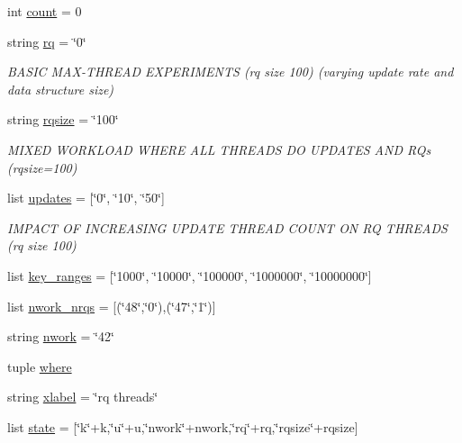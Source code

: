 \begin{DoxyCompactItemize}
int \hyperlink{namespacegraphs_aa0fc62a2a4ce78f5cecca51d9968b0a8}{count} = 0
\item 
string \hyperlink{namespacegraphs_a33bf9d2e68f4dc94babb18dc33f1b61f}{rq} = \char`\"{}0\char`\"{}
\begin{DoxyCompactList}\small\item\em B\+A\+S\+IC M\+A\+X-\/\+T\+H\+R\+E\+AD E\+X\+P\+E\+R\+I\+M\+E\+N\+TS (rq size 100) (varying update rate and data structure size) \end{DoxyCompactList}\item 
string \hyperlink{namespacegraphs_ab34652bfd8c71e2cd2bd43e4e6524525}{rqsize} = \char`\"{}100\char`\"{}
\begin{DoxyCompactList}\small\item\em M\+I\+X\+ED W\+O\+R\+K\+L\+O\+AD W\+H\+E\+RE A\+LL T\+H\+R\+E\+A\+DS DO U\+P\+D\+A\+T\+ES A\+ND R\+Qs (rqsize=100) \end{DoxyCompactList}\item 
list \hyperlink{namespacegraphs_a222bd6a58314240f5bd2dea29ef99ea2}{updates} = \mbox{[}\char`\"{}0\char`\"{}, \char`\"{}10\char`\"{}, \char`\"{}50\char`\"{}\mbox{]}
\begin{DoxyCompactList}\small\item\em I\+M\+P\+A\+CT OF I\+N\+C\+R\+E\+A\+S\+I\+NG U\+P\+D\+A\+TE T\+H\+R\+E\+AD C\+O\+U\+NT ON RQ T\+H\+R\+E\+A\+DS (rq size 100) \end{DoxyCompactList}\item 
list \hyperlink{namespacegraphs_a56c4073988138ac93b88d0073f9af851}{key\+\_\+ranges} = \mbox{[}\char`\"{}1000\char`\"{}, \char`\"{}10000\char`\"{}, \char`\"{}100000\char`\"{}, \char`\"{}1000000\char`\"{}, \char`\"{}10000000\char`\"{}\mbox{]}
\item 
list \hyperlink{namespacegraphs_a65e532f76453ce16272c7242acb8a2d9}{nwork\+\_\+nrqs} = \mbox{[}(\char`\"{}48\char`\"{},\char`\"{}0\char`\"{}),(\char`\"{}47\char`\"{},\char`\"{}1\char`\"{})\mbox{]}
\item 
string \hyperlink{namespacegraphs_a97f8691efe037326e67783b38c178d7f}{nwork} = \char`\"{}42\char`\"{}
\item 
tuple \hyperlink{namespacegraphs_a3f641a99f0d63776af3f7bf756acb657}{where}
\item 
string \hyperlink{namespacegraphs_a13b5142f4c941140bcf3b2caf04f39b5}{xlabel} = \char`\"{}rq threads\char`\"{}
\item 
list \hyperlink{namespacegraphs_a7e28b4b5f2a57b0c7edebb674233cf1e}{state} = \mbox{[}\char`\"{}k\char`\"{}+k,\char`\"{}u\char`\"{}+u,\char`\"{}nwork\char`\"{}+nwork,\char`\"{}rq\char`\"{}+rq,\char`\"{}rqsize\char`\"{}+rqsize\mbox{]}

\end{DoxyCompactItemize}
